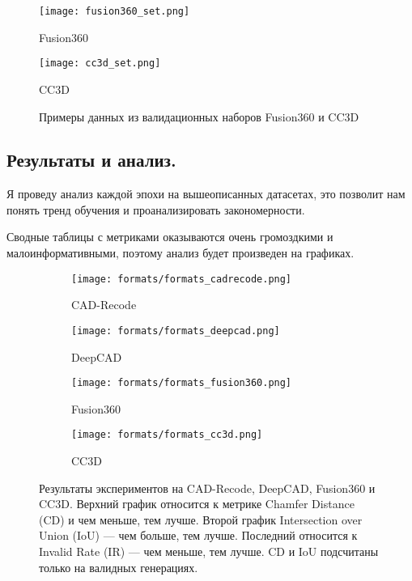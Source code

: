 \newpage

\begin{figure}[h!]
    \centering
    \texttt{[image: fusion360\_set.png]}
    \caption{Fusion360}

    \vspace{1em}

    \texttt{[image: cc3d\_set.png]}
    \caption{CC3D}

    \caption{Примеры данных из валидационных наборов Fusion360 и CC3D}
    \label{fig:datasets2}
\end{figure}

\newpage

\subsection{Результаты и анализ.}

Я проведу анализ каждой эпохи на вышеописанных датасетах, это позволит нам понять тренд обучения и проанализировать закономерности.

Сводные таблицы с метриками оказываются очень громоздкими и малоинформативными, поэтому анализ будет произведен на графиках.

\begin{figure}[h!]
    \centering
    \begin{subfigure}{0.45\linewidth}
        \centering
        \texttt{[image: formats/formats\_cadrecode.png]}
        \caption{CAD-Recode}
    \end{subfigure}
    \hfill
    \begin{subfigure}{0.45\linewidth}
        \centering
        \texttt{[image: formats/formats\_deepcad.png]}
        \caption{DeepCAD}
    \end{subfigure}

    \vspace{1em}

    \begin{subfigure}{0.45\linewidth}
        \centering
        \texttt{[image: formats/formats\_fusion360.png]}
        \caption{Fusion360}
    \end{subfigure}
    \hfill
    \begin{subfigure}{0.45\linewidth}
        \centering
        \texttt{[image: formats/formats\_cc3d.png]}
        \caption{CC3D}
    \end{subfigure}

    \caption{Результаты экспериментов на CAD-Recode, DeepCAD, Fusion360 и CC3D.
        Верхний график относится к метрике Chamfer Distance (CD) и чем меньше, тем лучше. Второй график Intersection over Union (IoU) — чем больше, тем лучше.
        Последний относится к Invalid Rate (IR) — чем меньше, тем лучше. CD и IoU подсчитаны только на валидных генерациях.}
    \label{fig:exp1}
\end{figure}

